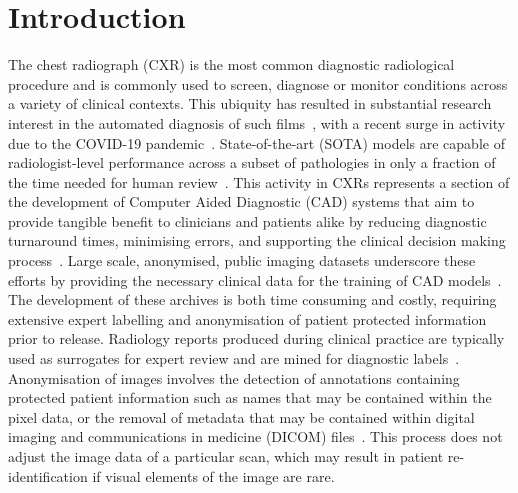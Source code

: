\documentclass{article}
\begin{document}
\section{Introduction}
\label{sec:introduction}
The chest radiograph (CXR) is the most common diagnostic radiological procedure \cite{adamCurrentStatusThoracic2021} and is commonly used to screen, diagnose or monitor conditions across a variety of clinical contexts. This ubiquity has resulted in substantial research interest in the automated diagnosis of such films~\cite{kermanyIdentifyingMedicalDiagnoses2018,majkowskaChestRadiographInterpretation2020,rajpurkarCheXNetRadiologistLevelPneumonia2017}, with a recent surge in activity due to the COVID-19 pandemic~\cite{ozturkAutomatedDetectionCOVID192020,shamoutArtificialIntelligenceSystem2020,wangCOVIDNetTailoredDeep2020}. State-of-the-art (SOTA) models are capable of radiologist-level performance across a subset of pathologies in only a fraction of the time needed for human review~\cite{irvinCheXpertLargeChest2019,rajpurkarDeepLearningChest2018,rajpurkarCheXNetRadiologistLevelPneumonia2017}. This activity in CXRs represents a section of the development of Computer Aided Diagnostic (CAD) systems that aim to provide tangible benefit to clinicians and patients alike by reducing diagnostic turnaround times, minimising errors, and supporting the clinical decision making process~\cite{rajpurkarDeepLearningChest2018,santosArtificialIntelligenceMachine2019}. Large scale, anonymised, public imaging datasets underscore these efforts by providing the necessary clinical data for the training of CAD models~\cite{irvinCheXpertLargeChest2019,johnsonMIMICCXRDeidentifiedPublicly2019,wangChestXray8HospitalscaleChest}. The development of these archives is both time consuming and costly, requiring extensive expert labelling and anonymisation of patient protected information prior to release. Radiology reports produced during clinical practice are typically used as surrogates for expert review and are mined for diagnostic labels~\cite{irvinCheXpertLargeChest2019,rajpurkarDeepLearningChest2018,rajpurkarCheXNetRadiologistLevelPneumonia2017}. Anonymisation of images involves the detection of annotations containing protected patient information such as names that may be contained within the pixel data, or the removal of metadata that may be contained within digital imaging and communications in medicine (DICOM) files~\cite{johnsonMIMICCXRDeidentifiedPublicly2019}. This process does not adjust the image data of a particular scan, which may result in patient re-identification if visual elements of the image are rare. 
\end{document}
